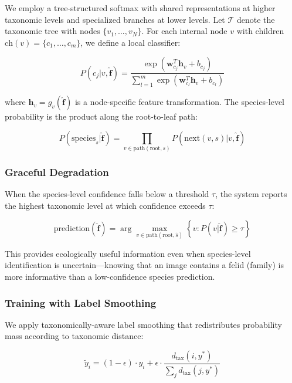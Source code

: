 \documentclass[11pt,letterpaper]{article}
\begin{document}
We employ a tree-structured softmax with shared representations at higher taxonomic levels and specialized branches at lower levels. Let $\mathcal{T}$ denote the taxonomic tree with nodes $\{v_1, \ldots, v_N\}$. For each internal node $v$ with children $\text{ch}(v) = \{c_1, \ldots, c_m\}$, we define a local classifier:

\begin{equation}
P(c_j | v, \hat{\mathbf{f}}) = \frac{\exp(\mathbf{w}_{c_j}^T \mathbf{h}_v + b_{c_j})}{\sum_{l=1}^{m} \exp(\mathbf{w}_{c_l}^T \mathbf{h}_v + b_{c_l})}
\end{equation}

where $\mathbf{h}_v = g_v(\hat{\mathbf{f}})$ is a node-specific feature transformation. The species-level probability is the product along the root-to-leaf path:

\begin{equation}
P(\text{species}_s | \hat{\mathbf{f}}) = \prod_{v \in \text{path}(\text{root}, s)} P(\text{next}(v, s) | v, \hat{\mathbf{f}})
\end{equation}

\subsubsection{Graceful Degradation}

When the species-level confidence falls below a threshold $\tau$, the system reports the highest taxonomic level at which confidence exceeds $\tau$:

\begin{equation}
\text{prediction}(\hat{\mathbf{f}}) = \arg\max_{v \in \text{path}(\text{root}, \hat{s})} \left\{ v : P(v | \hat{\mathbf{f}}) \geq \tau \right\}
\end{equation}

This provides ecologically useful information even when species-level identification is uncertain---knowing that an image contains a felid (family) is more informative than a low-confidence species prediction.

\subsubsection{Training with Label Smoothing}

We apply taxonomically-aware label smoothing that redistributes probability mass according to taxonomic distance:

\begin{equation}
\tilde{y}_i = (1 - \epsilon) \cdot y_i + \epsilon \cdot \frac{d_{\text{tax}}(i, y^*)}{\sum_j d_{\text{tax}}(j, y^*)}
\end{equation}
\end{document}
